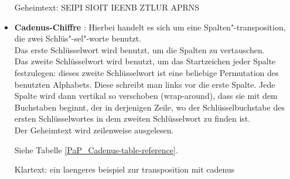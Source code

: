 \begin{refsegment}
\begin{itemize}
   Geheimtext: SEIPI SIOIT IEENB ZTLUR APRNS\\


\item \textbf{Cadenus-Chiffre} \cite{ACA2002}:
   Hierbei handelt es sich um eine
   Spalten"-transposition, die zwei Schlüs"-sel"-worte benutzt.\\
   Das erste Schlüsselwort wird benutzt, um die Spalten zu vertauschen.\\
   Das zweite Schlüsselwort wird benutzt, um das Startzeichen jeder Spalte
   festzulegen: dieses zweite Schlüsselwort ist eine beliebige Permutation
   des benutzten Alphabets. Diese schreibt man links vor die erste Spalte.
   Jede Spalte wird dann vertikal so verschoben (wrap-around), dass sie mit dem
   Buchstaben beginnt, der in derjenigen Zeile, wo der Schlüsselbuchstabe des
   ersten Schlüsselwortes in dem zweiten Schlüsselwort zu finden ist.\\
   Der Geheimtext wird zeilenweise ausgelesen.

   Siehe Tabelle \ref{PaP_Cadenus-table-reference}.

   Klartext: ein laengeres beispiel zur transposition mit cadenus


\end{itemize}
\end{refsegment}
